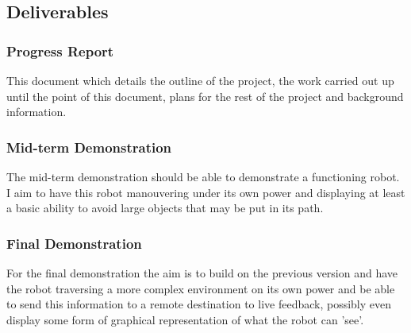 \documentclass[11pt,fleqn,twoside]{article}
\begin{document}
\subsection{Deliverables}

\subsubsection{Progress Report}
This document which details the outline of the project, the work carried out up until the point of this document, plans for the rest of the project and background information.
\subsubsection{Mid-term Demonstration}
The mid-term demonstration should be able to demonstrate a functioning robot.  I aim to have this robot manouvering under its own power and displaying at least a basic ability to avoid large objects that may be put in its path.
\subsubsection{Final Demonstration}
For the final demonstration the aim is to build on the previous version and have the robot traversing a more complex environment on its own power and be able to send this information to a remote destination to live feedback, possibly even display some form of graphical representation of what the robot can 'see'.
\end{document}

